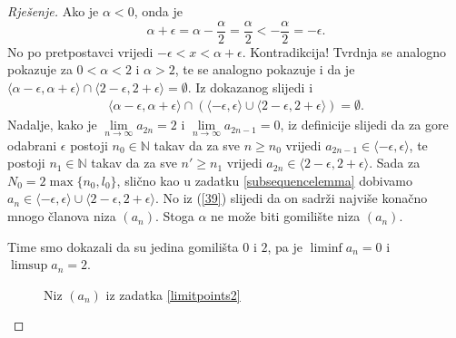 \begin{proof}[Rješenje]
Ako je \(\alpha<0\), onda je
\[\alpha+\epsilon=\alpha-\dfrac{\alpha}{2}=\dfrac{\alpha}{2}<-\dfrac{\alpha}{2}=-\epsilon.\]
No po pretpostavci vrijedi \(-\epsilon<x<\alpha+\epsilon\). Kontradikcija! Tvrdnja se analogno pokazuje za \(0<\alpha<2\) i \(\alpha>2\), te se analogno pokazuje i da je \(\langle \alpha-\epsilon,\alpha+\epsilon\rangle\cap\langle 2-\epsilon,2+\epsilon\rangle=\emptyset\).
Iz dokazanog slijedi i 
\begin{gather}
\label{39}
\langle \alpha-\epsilon,\alpha+\epsilon\rangle\cap\left(\langle -\epsilon,\epsilon\rangle \cup\langle 2-\epsilon,2+\epsilon\rangle\right)=\emptyset.
\end{gather}
Nadalje, kako je \(\lim\limits_{n\to \infty}{a_{2n}}=2\) i \(\lim\limits_{n\to \infty}{a_{2n-1}}=0\), iz definicije slijedi da za gore odabrani \(\epsilon\) postoji \(n_0\in \mathbb{N}\) takav da za sve \(n\geq n_0\) vrijedi \(a_{2n-1}\in \langle-\epsilon, \epsilon\rangle\), te postoji \(n_1\in \mathbb{N}\) takav da za sve \(n'\geq n_1\) vrijedi \(a_{2n}\in \langle 2-\epsilon, 2+\epsilon\rangle\). Sada za \(N_0=2\max\{n_0, l_0\}\), slično kao u zadatku \ref{subsequencelemma} dobivamo \(a_n\in \langle-\epsilon, \epsilon\rangle \cup \langle 2-\epsilon, 2+\epsilon\rangle\). No iz (\ref{39}) slijedi da on sadrži najviše konačno mnogo članova niza \((a_n)\). Stoga \(\alpha\) ne može biti gomilište niza \((a_n)\).

Time smo dokazali da su jedina gomilišta \(0\) i \(2\), pa je \(\liminf{a_n}=0\) i \(\limsup{a_n}=2\).
\begin{figure}[ht]
\begin{center}
\caption{Niz \((a_n)\) iz zadatka \ref{limitpoints2}}
\label{fig:6.1}
\end{center}
\end{figure}
\end{proof}
